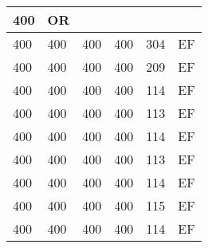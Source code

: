 \begin{table}[]
\begin{tabular}{lllll|l|}
400                                & OR                                    \\ \hline
400                                 & 400                                & 400                                & 400                                & 
304                                & EF                                    \\ \hline
400                                 & 400                                & 400                                & 400                                & 
209                                & EF                                    \\ \hline
400                                 & 400                                & 400                                & 400                                & 
114                                & EF                                    \\ \hline
400                                 & 400                                & 400                                & 400                                & 
113                                & EF                                    \\ \hline
400                                 & 400                                & 400                                & 400                                & 
114                                & EF                                    \\ \hline
400                                 & 400                                & 400                                & 400                                & 
113                                & EF                                    \\ \hline
400                                 & 400                                & 400                                & 400                                & 
114                                & EF                                    \\ \hline
400                                 & 400                                & 400                                & 400                                & 
115                                & EF                                    \\ \hline
400                                 & 400                                & 400                                & 400                                & 
114                                & EF                                    \\ \hline

\end{tabular}
\end{table}
